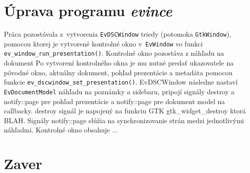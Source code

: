 \documentclass[12pt,oneside,final]{fithesis2}
\begin{document}
\chapter{Úprava programu \emph{evince}}
Práca pozostávala z~vytvorenia \texttt{EvDSCWindow} triedy (potomoka \texttt{GtkWindow}), pomocou ktorej je vytvorené kontrolné okno v~\texttt{EvWindow} vo funkci \texttt{ev\_window\_run\_presentation()}. Kontrolné okno pozostáva z náhľadu na dokument Po vytvorení kontrolného okna je mu nutné predať ukazovatele na pôvodné okno, aktuálny dokument, pohľad prezentácie a metadáta pomocou funkcie \texttt{ev\_dscwindow\_set\_presentation()}. EvDSCWindow následne nastaví \texttt{EvDocumentModel} náhľadu na poznámky a sidebaru, pripojí signály destroy a notify::page pre pohľad prezentácie a notify::page pre dokument model na callbacky. destroy signál je napojený na funkciu GTK gtk\_widget\_destroy ktorá BLAH. Signály notify::page slúžia na synchronizovanie strán medzi jednotlivými náhľadmi. Kontrolné okno obsahuje ...

\chapter{Zaver}



\end{document}
